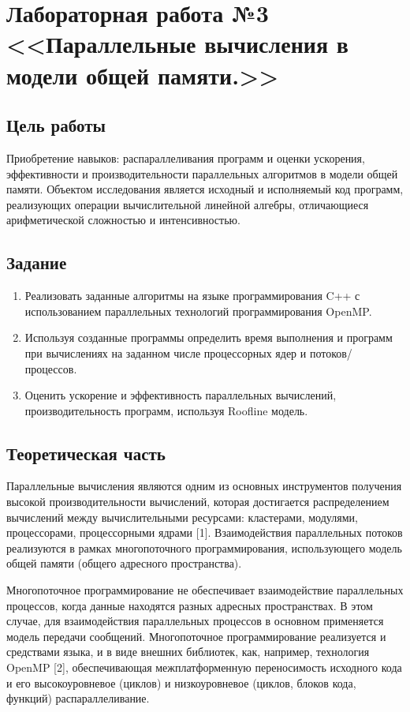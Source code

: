 \section*{Лабораторная работа №3\\ 
<<Параллельные вычисления в модели общей памяти.>>}

\subsection*{Цель работы}
Приобретение навыков: распараллеливания программ и оценки ускорения, эффективности и производительности параллельных алгоритмов в модели общей памяти.
Объектом исследования является исходный и исполняемый код программ, реализующих операции вычислительной линейной алгебры, отлича\-ющиеся арифметической сложностью и интенсивностью.

\subsection*{Задание}
\begin{enumerate}
\item Реализовать заданные алгоритмы на языке программирования C++ с использованием параллельных технологий программирования OpenMP.
\item Используя созданные программы определить время выполнения и программ при вычислениях на заданном числе процессорных ядер и потоков/процессов.
\item Оценить ускорение и эффективность параллельных вычислений, производительность программ, используя Roofline модель.
\end{enumerate}

\subsection*{Теоретическая часть}
Параллельные вычисления являются одним из основных инструментов получения высокой производительности вычислений, которая достигается распределением вычислений между вычислительными ресурсами: кластерами, модулями, процессорами, процессорными ядрами [1]. Взаимодействия параллельных потоков реализуются в рамках многопоточного программирования, использующего модель общей памяти (общего адресного пространства). 

Многопоточное программирование не обеспечивает взаимодействие параллельных процессов, когда данные находятся разных адресных пространствах. В этом случае, для взаимодействия параллельных процессов в основном применяется модель передачи сообщений. Многопоточное программирование реализуется и средствами языка, и в виде внешних библиотек, как, например, технология OpenMP [2], обеспечивающая межплатформенную переносимость исходного кода и его высокоуровневое (циклов) и низкоуровневое (циклов, блоков кода, функций) распараллеливание. 

